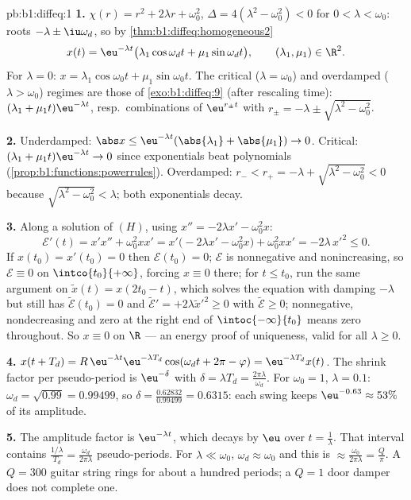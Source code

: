 \begin{solution}{pb:b1:diffeq:1}
\textbf{1.} $\chi(r) = r^2 + 2\lambda r + \omega_0^2$, $\Delta =
4(\lambda^2 - \omega_0^2) < 0$ for $0 < \lambda < \omega_0$: roots
$-\lambda \pm \iu\omega_d$, so by
\cref{thm:b1:diffeq:homogeneous2}
\[
x(t) = \eu^{-\lambda t}\bigl(\lambda_1\cos\omega_d t +
\mu_1\sin\omega_d t\bigr), \qquad (\lambda_1, \mu_1) \in \R^2 .
\]
For $\lambda = 0$: $x = \lambda_1\cos\omega_0 t +
\mu_1\sin\omega_0 t$. The critical ($\lambda = \omega_0$) and
overdamped ($\lambda > \omega_0$) regimes are those of
\cref{exo:b1:diffeq:9} (after rescaling time): $(\lambda_1 +
\mu_1 t)\eu^{-\lambda t}$, resp.\ combinations of $\eu^{r_\pm t}$
with $r_\pm = -\lambda \pm \sqrt{\lambda^2 - \omega_0^2}$.

\textbf{2.} Underdamped: $\abs x \leq \eu^{-\lambda
t}(\abs{\lambda_1} + \abs{\mu_1}) \to 0$. Critical: $(\lambda_1 +
\mu_1 t)\eu^{-\lambda t} \to 0$ since exponentials beat
polynomials (\cref{prop:b1:functions:powerrules}). Overdamped:
$r_- < r_+ = -\lambda + \sqrt{\lambda^2 - \omega_0^2} < 0$
because $\sqrt{\lambda^2 - \omega_0^2} < \lambda$; both
exponentials decay.

\textbf{3.} Along a solution of $(H)$, using $x'' = -2\lambda x' -
\omega_0^2 x$:
\[
\mathcal E'(t) = x'x'' + \omega_0^2 x x'
= x'\bigl(-2\lambda x' - \omega_0^2 x\bigr) + \omega_0^2 xx'
= -2\lambda\,x'^2 \leq 0 .
\]
If $x(t_0) = x'(t_0) = 0$ then $\mathcal E(t_0) = 0$; $\mathcal E$
is nonnegative and nonincreasing, so $\mathcal E \equiv 0$ on
$\intco{t_0}{+\infty}$, forcing $x \equiv 0$ there; for $t \leq
t_0$, run the same argument on $\tilde x(t) = x(2t_0 - t)$, which
solves the equation with damping $-\lambda$ but still has
$\tilde{\mathcal E}(t_0) = 0$ and $\tilde{\mathcal E}' =
+2\lambda\tilde x'^2 \geq 0$ with $\tilde{\mathcal E} \geq 0$;
nonnegative, nondecreasing and zero at the right end of
$\intoc{-\infty}{t_0}$ means zero throughout. So $x \equiv 0$ on
$\R$ --- an energy proof of uniqueness, valid for all $\lambda
\geq 0$.

\textbf{4.} $x(t + T_d) = R\,\eu^{-\lambda t}\eu^{-\lambda
T_d}\cos(\omega_d t + 2\pi - \varphi) = \eu^{-\lambda T_d}x(t)$.
The shrink factor per pseudo-period is $\eu^{-\delta}$ with
$\delta = \lambda T_d = \frac{2\pi\lambda}{\omega_d}$. For
$\omega_0 = 1$, $\lambda = 0.1$: $\omega_d = \sqrt{0.99} =
0.99499$, so $\delta = \frac{0.62832}{0.99499} = 0.6315$: each
swing keeps $\eu^{-0.63} \approx 53\%$ of its amplitude.

\textbf{5.} The amplitude factor is $\eu^{-\lambda t}$, which
decays by $\eu$ over $t = \frac1\lambda$. That interval contains
$\frac{1/\lambda}{T_d} = \frac{\omega_d}{2\pi\lambda}$
pseudo-periods. For $\lambda \ll \omega_0$, $\omega_d \approx
\omega_0$ and this is $\approx \frac{\omega_0}{2\pi\lambda} =
\frac Q\pi$. A $Q = 300$ guitar string rings for about a hundred
periods; a $Q = 1$ door damper does not complete one.


\end{solution}
